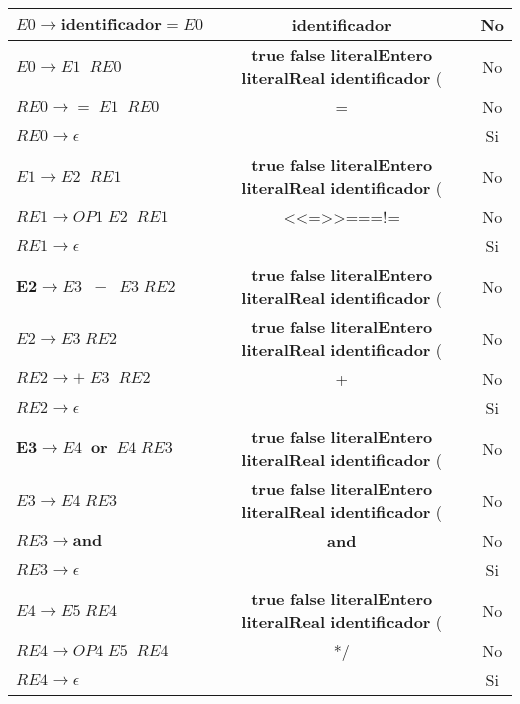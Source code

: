 \begin{table}[h]
\begin{tabular}{l|c|c}
        $E0 \longrightarrow \textbf{identificador} = E0$ & \textbf{identificador} & No \\ \hline
        $E0 \longrightarrow E1\;\;RE0$ & \textbf{true} \textbf{false} \textbf{literalEntero} \textbf{literalReal}
            \textbf{identificador} ( & No \\ \hline
        $RE0 \longrightarrow =\;E1\;\;RE0$ & = & No \\ \hline
        $RE0 \longrightarrow \epsilon$ & & Si \\ \hline
        $E1 \longrightarrow E2\;\;RE1$ &  \textbf{true} \textbf{false} \textbf{literalEntero} \textbf{literalReal}
            \textbf{identificador} ( & No  \\ \hline
        $RE1 \longrightarrow OP1\;E2\;\;RE1$ & <\;\;<=\;\;>\;\;>=\;\;==\;\;!= & No \\
        \hline
        $RE1 \longrightarrow \epsilon$ & & Si \\ \hline
        $\textbf{E2} \longrightarrow E3\;\;-\;\;E3\;RE2$ &  \textbf{true} \textbf{false} \textbf{literalEntero} \textbf{literalReal}
            \textbf{identificador} ( & No  \\ \hline
        $E2 \longrightarrow E3\;RE2$ &  \textbf{true} \textbf{false} \textbf{literalEntero} \textbf{literalReal}
            \textbf{identificador} ( & No  \\ \hline
        $RE2 \longrightarrow +\;E3\;\;RE2$ & + & No \\ \hline
        $RE2 \longrightarrow \epsilon$ & & Si \\ \hline
        $\textbf{E3} \longrightarrow E4\;\;\textbf{or}\;\;E4\;RE3$ &  \textbf{true} \textbf{false} \textbf{literalEntero} \textbf{literalReal}
            \textbf{identificador} ( & No  \\ \hline
        $E3 \longrightarrow E4\;RE3$ &  \textbf{true} \textbf{false} \textbf{literalEntero} \textbf{literalReal}
            \textbf{identificador} ( & No  \\ \hline
        $RE3 \longrightarrow \textbf{and}$ & \textbf{and} & No \\ \hline
        $RE3 \longrightarrow \epsilon$ & & Si \\ \hline
        $E4 \longrightarrow E5\;RE4$ &  \textbf{true} \textbf{false} \textbf{literalEntero} \textbf{literalReal}
            \textbf{identificador} ( & No  \\ \hline
        $RE4 \longrightarrow OP4\;E5\;\;RE4$ & *\;\;/ & No \\
        \hline
        $RE4 \longrightarrow \epsilon$ & & Si \\ \hline

\end{tabular}
\end{table}
